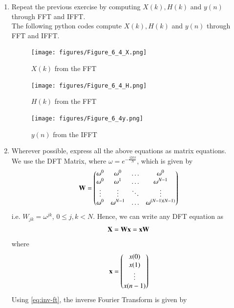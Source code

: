 \documentclass[journal,12pt,twocolumn]{IEEEtran}
\renewcommand\thesection{\arabic{section}}
\begin{document}
\begin{enumerate}[label=\thesection.\arabic*]
\item Repeat the previous exercise by computing $X(k), H(k)$ and $y(n)$ through FFT and 
IFFT.
\\
\solution
The following python codes compute $X(k), H(k)$ and $y(n)$ through FFT and 
IFFT.

\begin{figure}[!ht]
	\centering
	\texttt{[image: figures/Figure\_6\_4\_X.png]}
	\caption{$X(k)$ from the FFT}
\end{figure}
\begin{figure}[!ht]
	\centering
	\texttt{[image: figures/Figure\_6\_4\_H.png]}
	\caption{$H(k)$ from the FFT}
\end{figure}
\begin{figure}[!ht]
	\centering
	\texttt{[image: figures/Figure\_6\_4y.png]}
	\caption{$y(n)$ from the IFFT}
\end{figure}
%
\item Wherever possible, express all the above equations as matrix equations.
\\
\solution
We use the DFT Matrix, where $\omega = e^{-\frac{j2k\pi}{N}}$, which is given by
\begin{align}
	\mathbf{W} = 
	\begin{pmatrix}
		\omega^0 & \omega^0 & \ldots & \omega^0 \\
		\omega^0 & \omega^1 & \ldots & \omega^{N - 1} \\
		\vdots & \vdots & \ddots & \vdots \\
		\omega^0 & \omega^{N - 1} & \ldots & \omega^{(N -1)(N - 1)}
	\end{pmatrix}
\end{align}
i.e. $W_{jk} = \omega^{jk}$, $0 \leq j, k < N$. Hence, we can write any DFT equation as
\begin{align}
	\mathbf{X} = \mathbf{W}\mathbf{x} = \mathbf{x}\mathbf{W}
\end{align}
\noindent where
\begin{align}
	\mathbf{x} = 
	\begin{pmatrix}
		x(0) \\ x(1) \\ \vdots \\ x(n - 1)
	\end{pmatrix}
\end{align}
\noindent Using \eqref{eq:inv-ft}, the inverse Fourier Transform is given by

\end{enumerate}
\end{document}
